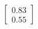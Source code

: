 \documentclass[preview]{standalone}
\begin{document}
\begin{align*}
\begin{bmatrix} 0.83 \\ 0.55 \end{bmatrix}
\end{align*}
\end{document}

